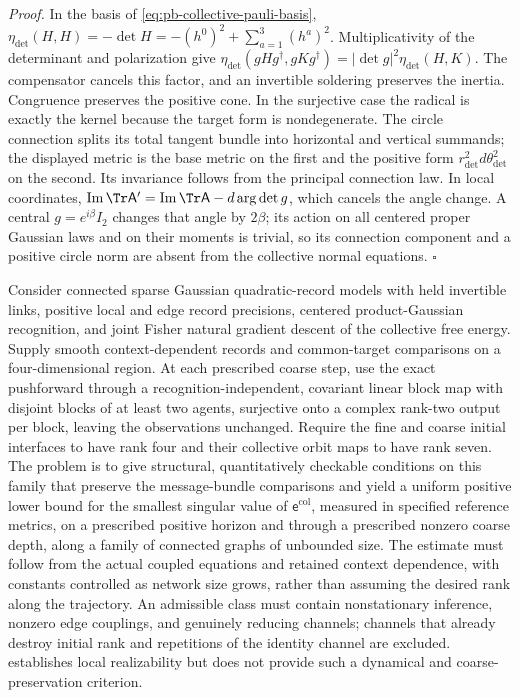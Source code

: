 \noindent\emph{Proof.}
In the basis of \cref{eq:pb-collective-pauli-basis},
\(\eta_{\det}(H,H)=-\det H=-(h^0)^2+\sum_{a=1}^3(h^a)^2\).
Multiplicativity of the determinant and polarization give
\(\eta_{\det}(gHg^\dagger,gKg^\dagger)=|\det g|^2\eta_{\det}(H,K)\).
The compensator cancels this factor, and an invertible soldering preserves the inertia.
Congruence preserves the positive cone. In the surjective case the radical is exactly the
kernel because the target form is nondegenerate. The circle connection splits its total tangent
bundle into horizontal and vertical summands; the displayed metric is the base metric on the
first and the positive form \(r_{\det}^2d\theta_{\det}^2\) on the second. Its invariance follows
from the principal connection law. In local coordinates,
\(\operatorname{Im}\Tr\mathsf A'=\operatorname{Im}\Tr\mathsf A-d\arg\det g\), which cancels
the angle change. A central \(g=e^{i\beta}I_2\) changes that angle by \(2\beta\); its action on
all centered proper Gaussian laws and on their moments is trivial, so its connection component
and a positive circle norm are absent from the collective normal equations. \hfill$\square$

Consider connected sparse Gaussian quadratic-record models with held invertible links, positive
local and edge record precisions, centered product-Gaussian recognition, and joint Fisher natural
gradient descent of the collective free energy. Supply smooth context-dependent records and
common-target comparisons on a four-dimensional region. At each prescribed coarse step, use the
exact pushforward through a recognition-independent, covariant linear block map with disjoint
blocks of at least two agents, surjective onto a complex rank-two output per block, leaving the
observations unchanged. Require the fine and coarse initial interfaces to have rank four and their collective
orbit maps to have rank seven. The problem is to give structural, quantitatively checkable
conditions on this family that preserve the message-bundle comparisons and yield a uniform
positive lower bound for the smallest singular value of \(\mathsf e^{\mathrm{col}}\), measured
in specified reference metrics, on a prescribed positive horizon and through a prescribed
nonzero coarse depth, along a family of connected graphs of unbounded size. The estimate must follow from
the actual coupled equations and retained context dependence, with constants controlled as
network size grows, rather than assuming the desired rank along the trajectory. An admissible
class must contain nonstationary inference, nonzero edge couplings, and genuinely reducing
channels; channels that already destroy initial rank and repetitions of the identity channel
are excluded.  establishes local realizability but
does not provide such a dynamical and coarse-preservation criterion.


